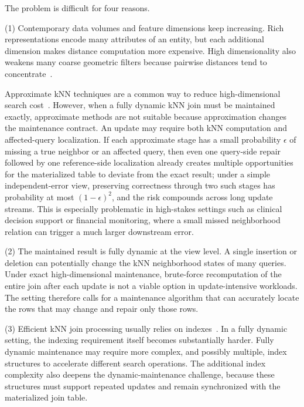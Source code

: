 The problem is difficult for four reasons.

\noindent(1) Contemporary data volumes and feature dimensions keep increasing. Rich representations encode many attributes of an entity, but each additional dimension makes distance computation more expensive. High dimensionality also weakens many coarse geometric filters because pairwise distances tend to concentrate~\cite{beyer1999nearest,kouiroukidis2011effects,gao2023high,zhao2023towards}.

\noindent Approximate kNN techniques are a common way to reduce high-dimensional search cost~\cite{bawa2005lsh,andoni2008near,jegou2010product,muja2014scalable,li2019approximate,gao2023high,zhao2023towards}. However, when a fully dynamic kNN join must be maintained exactly, approximate methods are not suitable because approximation changes the maintenance contract. An update may require both kNN computation and affected-query localization. If each approximate stage has a small probability $\epsilon$ of missing a true neighbor or an affected query, then even one query-side repair followed by one reference-side localization already creates multiple opportunities for the materialized table to deviate from the exact result; under a simple independent-error view, preserving correctness through two such stages has probability at most $(1-\epsilon)^2$, and the risk compounds across long update streams. This is especially problematic in high-stakes settings such as clinical decision support or financial monitoring, where a small missed neighborhood relation can trigger a much larger downstream error.

\noindent(2) The maintained result is fully dynamic at the view level. A single insertion or deletion can potentially change the kNN neighborhood states of many queries. Under exact high-dimensional maintenance, brute-force recomputation of the entire join after each update is not a viable option in update-intensive workloads. The setting therefore calls for a maintenance algorithm that can accurately locate the rows that may change and repair only those rows.

\noindent(3) Efficient kNN join processing usually relies on indexes~\cite{bohm2001cost,bohm2004k,xia2004gorder,yu2007efficient}. In a fully dynamic setting, the indexing requirement itself becomes substantially harder. Fully dynamic maintenance may require more complex, and possibly multiple, index structures to accelerate different search operations. The additional index complexity also deepens the dynamic-maintenance challenge, because these structures must support repeated updates and remain synchronized with the materialized join table.

